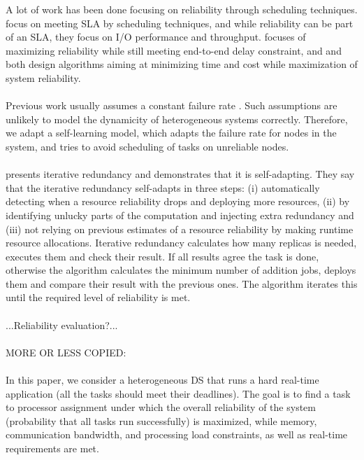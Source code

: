 \documentclass{cslthse-msc}
\begin{document}
A lot of work has been done focusing on reliability through scheduling techniques. \cite{SLASched} focus on meeting SLA by scheduling techniques, and while reliability can be part of an SLA, they focus on I/O performance and throughput. \cite{algoMaxRelEndToEndConstraint} focuses of maximizing reliability while still meeting end-to-end delay constraint, and \cite{algoMinExTime} and \cite{algoOptTimeMaxRel} both design algorithms aiming at minimizing time and cost while maximization of system reliability.
\\\\
Previous work usually assumes a constant failure rate \cite{algoMaxRelEndToEndConstraint} \cite{algoMinExTime} \cite{relModelDistSimSystem} \cite{optTaskAllocationForMaxRel} \cite{perfImplPerCheckPoint}. Such assumptions are unlikely to model the dynamicity of heterogeneous systems correctly. Therefore, we adapt a self-learning model, which adapts the failure rate for nodes in the system, and tries to avoid scheduling of tasks on unreliable nodes.
\\\\
\cite{selfAdaptRel} presents iterative redundancy and demonstrates that it is self-adapting. They say that the iterative redundancy self-adapts in three steps: (i) automatically detecting when a resource reliability drops and deploying more resources, (ii) by identifying unlucky parts of the computation and injecting extra redundancy and (iii) not relying on previous estimates of a resource reliability by making runtime resource allocations. Iterative redundancy calculates how many replicas is needed, executes them and check their result. If all results agree the task is done, otherwise the algorithm calculates the minimum number of addition jobs, deploys them and compare their result with the previous ones. The algorithm iterates this until the required level of reliability is met.
\\\\
...Reliability evaluation?...
\\\\
MORE OR LESS COPIED:
\\\\
In this paper, we consider a heterogeneous DS that runs a hard real-time application (all the tasks should meet their deadlines). The goal is to find a task to processor assignment under which the overall reliability of the system (probability that all tasks run successfully) is maximized, while memory, communication bandwidth, and processing load constraints, as well as real-time requirements are met. \cite{optTaskAllocationForMaxRel}
\end{document}

